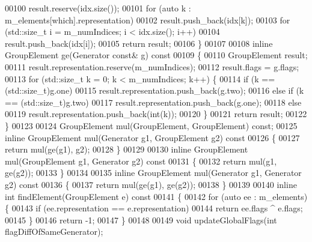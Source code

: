 \begin{DoxyCode}
00100       result.reserve(idx.size());
00101       \textcolor{keywordflow}{for} (\textcolor{keyword}{auto} k : m\_elements[which].representation)
00102         result.push\_back(idx[k]);
00103       \textcolor{keywordflow}{for} (std::size\_t i = m\_numIndices; i < idx.size(); i++)
00104         result.push\_back(idx[i]);
00105       \textcolor{keywordflow}{return} result;
00106     \}
00107 
00108     \textcolor{keyword}{inline} GroupElement ge(Generator \textcolor{keyword}{const}& g)\textcolor{keyword}{ const}
00109 \textcolor{keyword}{    }\{
00110       GroupElement result;
00111       result.representation.reserve(m\_numIndices);
00112       result.flags = g.flags;
00113       \textcolor{keywordflow}{for} (std::size\_t k = 0; k < m\_numIndices; k++) \{
00114         \textcolor{keywordflow}{if} (k == (std::size\_t)g.one)
00115           result.representation.push\_back(g.two);
00116         \textcolor{keywordflow}{else} \textcolor{keywordflow}{if} (k == (std::size\_t)g.two)
00117           result.representation.push\_back(g.one);
00118         \textcolor{keywordflow}{else}
00119           result.representation.push\_back(\textcolor{keywordtype}{int}(k));
00120       \}
00121       \textcolor{keywordflow}{return} result;
00122     \}
00123 
00124     GroupElement mul(GroupElement, GroupElement) \textcolor{keyword}{const};
00125     \textcolor{keyword}{inline} GroupElement mul(Generator g1, GroupElement g2)\textcolor{keyword}{ const}
00126 \textcolor{keyword}{    }\{
00127       \textcolor{keywordflow}{return} mul(ge(g1), g2);
00128     \}
00129 
00130     \textcolor{keyword}{inline} GroupElement mul(GroupElement g1, Generator g2)\textcolor{keyword}{ const}
00131 \textcolor{keyword}{    }\{
00132       \textcolor{keywordflow}{return} mul(g1, ge(g2));
00133     \}
00134 
00135     \textcolor{keyword}{inline} GroupElement mul(Generator g1, Generator g2)\textcolor{keyword}{ const}
00136 \textcolor{keyword}{    }\{
00137       \textcolor{keywordflow}{return} mul(ge(g1), ge(g2));
00138     \}
00139 
00140     \textcolor{keyword}{inline} \textcolor{keywordtype}{int} findElement(GroupElement e)\textcolor{keyword}{ const}
00141 \textcolor{keyword}{    }\{
00142       \textcolor{keywordflow}{for} (\textcolor{keyword}{auto} ee : m\_elements) \{
00143         \textcolor{keywordflow}{if} (ee.representation == e.representation)
00144           \textcolor{keywordflow}{return} ee.flags ^ e.flags;
00145       \}
00146       \textcolor{keywordflow}{return} -1;
00147     \}
00148 
00149     \textcolor{keywordtype}{void} updateGlobalFlags(\textcolor{keywordtype}{int} flagDiffOfSameGenerator);

\end{DoxyCode}
